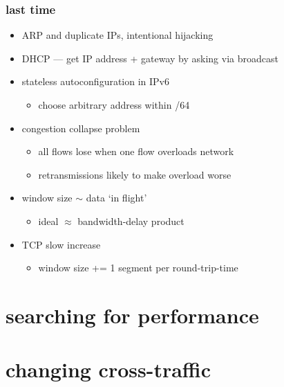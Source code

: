 \date{}
\title{}
\date{}
\usepackage{pgfplots}
\pgfplotsset{compat=1.16}

\begin{frame}
    \titlepage
\end{frame}



\begin{frame}
\frametitle{last time}
\begin{itemize}
\item ARP and duplicate IPs, intentional hijacking
\item DHCP --- get IP address + gateway by asking via broadcast
\item stateless autoconfiguration in IPv6
    \begin{itemize}
        \item choose arbitrary address within /64
    \end{itemize}
\item congestion collapse problem
    \begin{itemize}
    \item all flows lose when one flow overloads network
    \item retransmissions likely to make overload worse
    \end{itemize}
\item window size $\sim$ data `in flight'
    \begin{itemize}
    \item ideal $\approx$ bandwidth-delay product
    \end{itemize}
\item TCP slow increase
    \begin{itemize}
    \item window size += 1 segment per round-trip-time
    \end{itemize}
\end{itemize}
\end{frame}

\section{searching for performance}


\section{changing cross-traffic}


